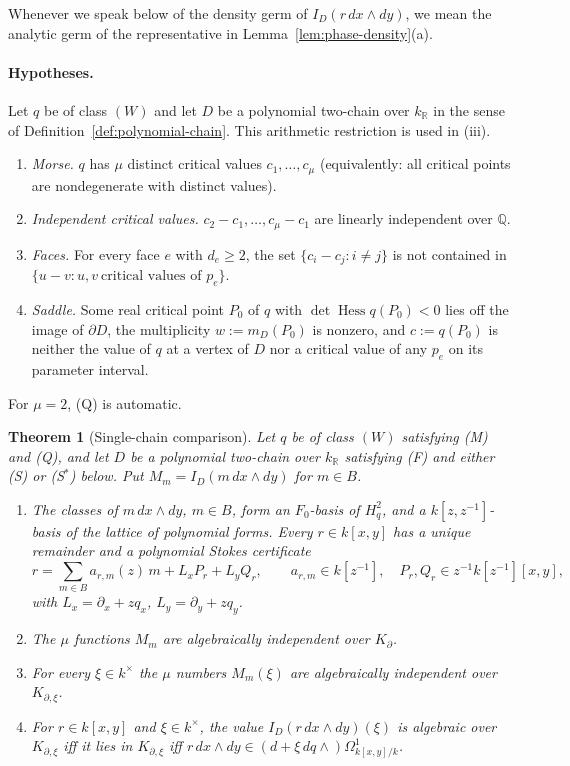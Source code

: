 \documentclass[11pt]{article}
\numberwithin{equation}{section}
\newtheorem{theorem}{Theorem}[section]
\theoremstyle{definition}
\theoremstyle{remark}
\newcommand{\Q}{\mathbb Q}
\newcommand{\R}{\mathbb R}
\newcommand{\dd}{\,d}
\newcommand{\Hq}{H_q^2}
\begin{document}
Whenever we speak below of the density germ of
$I_D(r\,dx\wedge dy)$, we mean the analytic germ of the representative
in Lemma~\ref{lem:phase-density}(a).

\paragraph{Hypotheses.} Let $q$ be of class $(W)$ and let $D$ be a
polynomial two-chain over $k_\R$ in the sense of
Definition~\ref{def:polynomial-chain}.  This arithmetic restriction is
used in (iii).
\begin{enumerate}[label=\textup{(\Alph*)},leftmargin=2.6em]
\item[(M)] \emph{Morse.} $q$ has $\mu$ distinct critical values
 $c_1,\dots,c_\mu$ (equivalently: all critical points are nondegenerate with
 distinct values).
\item[(Q)] \emph{Independent critical values.} $c_2-c_1,\dots,c_\mu-c_1$ are
 linearly independent over $\Q$.
\item[(F)] \emph{Faces.} For every face $e$ with $d_e\ge2$, the set
 $\{c_i-c_j:i\ne j\}$ is not contained in
 $\{u-v: u,v\ \text{critical values of }p_e\}$.
\item[(S)] \emph{Saddle.} Some real critical point $P_0$ of $q$ with
 $\det\operatorname{Hess}q(P_0)<0$ lies off the image of $\partial D$, the
 multiplicity $w:=m_D(P_0)$ is nonzero, and $c:=q(P_0)$ is neither the
 value of $q$ at a vertex of $D$ nor a critical value of any $p_e$ on its
 parameter interval.
\end{enumerate}
For $\mu=2$, (Q) is automatic.

\begin{theorem}[Single-chain comparison]\label{thm:main}
Let $q$ be of class $(W)$ satisfying \textup{(M)} and \textup{(Q)}, and let $D$
be a polynomial two-chain over $k_\R$ satisfying \textup{(F)} and either \textup{(S)} or \textup{(S$^*$)} below. Put
$M_m=I_D(m\dd x\wedge dy)$ for $m\in B$.
\begin{enumerate}[label=\textup{(\roman*)},leftmargin=2.4em]
\item The classes of $m\,dx\wedge dy$, $m\in B$, form an $F_0$-basis of $\Hq$,
 and a $k[z,z^{-1}]$-basis of the lattice of polynomial forms. Every
 $r\in k[x,y]$ has a unique remainder and a polynomial Stokes certificate
 \[
  r=\sum_{m\in B}a_{r,m}(z)\,m+L_xP_r+L_yQ_r,\qquad a_{r,m}\in k[z^{-1}],\quad
  P_r,Q_r\in z^{-1}k[z^{-1}][x,y],
 \]
 with $L_x=\partial_x+zq_x$, $L_y=\partial_y+zq_y$.
\item The $\mu$ functions $M_m$ are algebraically independent over $K_\partial$.
\item For every $\xi\in k^\times$ the $\mu$ numbers $M_m(\xi)$ are algebraically
 independent over $K_{\partial,\xi}$.
\item For $r\in k[x,y]$ and $\xi\in k^\times$, the value $I_D(r\dd x\wedge dy)(\xi)$
 is algebraic over $K_{\partial,\xi}$ iff it lies in $K_{\partial,\xi}$ iff
 $r\,dx\wedge dy\in(d+\xi\,dq\wedge)\Omega^1_{k[x,y]/k}$.
\end{enumerate}
\end{theorem}
\end{document}

